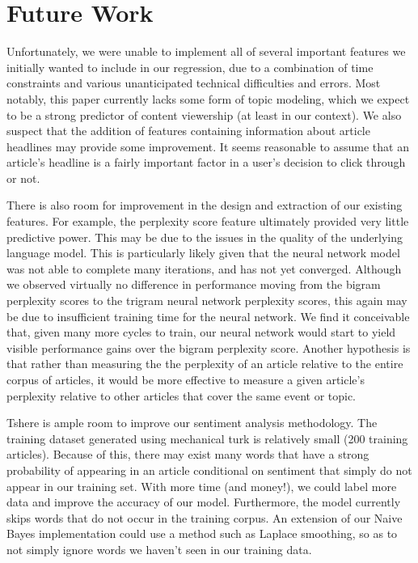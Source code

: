 \documentclass[fleqn,12pt]{SelfArx} %
\begin{document}
\section{Future Work}
Unfortunately, we were unable to implement all of several important features we initially wanted to include in our regression, due to a combination of time constraints and various unanticipated technical difficulties and errors. Most notably, this paper currently lacks some form of topic modeling, which we expect to be a strong predictor of content viewership (at least in our context). We also suspect that the addition of features containing information about article headlines may provide some improvement. It seems reasonable to assume that an article's headline is a fairly important factor in a user's decision to click through or not.

There is also room for improvement in the design and extraction of our existing features. For example, the perplexity score feature ultimately provided very little predictive power. This may be due to the issues in the quality of the underlying language model. This is particularly likely given that the neural network model was not able to complete many iterations, and has not yet converged. Although we observed virtually no difference in performance moving from the bigram perplexity scores to the trigram neural network perplexity scores, this again may be due to insufficient training time for the neural network. We find it conceivable that, given many more cycles to train, our neural network would start to yield visible performance gains over the bigram perplexity score. Another hypothesis is that rather than measuring the the perplexity of an article relative to the entire corpus of articles, it would be more effective to measure a given article's perplexity relative to other articles that cover the same event or topic. 

Tshere is ample room to improve our sentiment analysis methodology. The training dataset generated using mechanical turk is relatively small (200 training articles). Because of this, there may exist many words that have a strong probability of appearing in an article conditional on sentiment that simply do not appear in our training set. With more time (and money!), we could label more data and improve the accuracy of our model. Furthermore, the model currently skips words that do not occur in the training corpus. An extension of our Naive Bayes implementation could use a method such as Laplace smoothing, so as to not simply ignore words we haven't seen in our training data.
\end{document}
